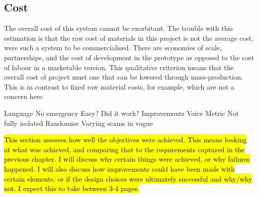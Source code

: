 \documentclass[main.tex]{subfiles}
\begin{document}
\subsection{Cost}
The overall cost of this system cannot be exorbitant. The trouble with this estimation is that the raw cost of materials in this project is not the average cost, were such a system to be commercialised. There are economies of scale, partnerships, and the cost of development in the prototype as opposed to the cost of labour in a marketable version. This qualitative criterion means that the overall cost of project must one that can be lowered through mass-production. This is in contrast to fixed raw material costs, for example, which are not a concern here.

Language
No emergency
Easy?
Did it work?
Improvements
Voice Metric
Not fully isolated
Randomise
Varying scams in vogue


\hl{This section assesses how well the objectives were achieved. This means looking at what was achieved, and comparing that to the requirements captured in the previous chapter. I will discuss why certain things were achieved, or why failures happened. I will also discuss how improvements could have been made with certain elements, or if the design choices were ultimately successful and why/why not. I expect this to take between 3-4 pages.}
\end{document}
